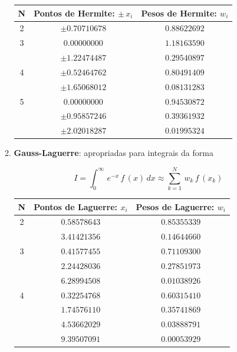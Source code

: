 \begin{enumerate}
\begin{enumerate}
{
\footnotesize
	\begin{center}
		\begin{tabular}{|c|c|c|}
		\hline		
		\textbf{N} & \textbf{Pontos de Hermite: $\pm \, x_i$} & \textbf{Pesos de Hermite: $w_i$} \\
		\hline \hline
		2 & $\pm 0.70710678$ & $0.88622692$ \\
		\hline
		3 & $0.00000000$     & $1.18163590$ \\
		  & $\pm 1.22474487$ & $0.29540897$ \\
		\hline
		4 & $\pm 0.52464762$ & $0.80491409$ \\
		  & $\pm 1.65068012$ & $0.08131283$ \\
		\hline
		5 & $    0.00000000$ & $0.94530872$ \\
		  & $\pm 0.95857246$ & $0.39361932$ \\
		  & $\pm 2.02018287$ & $0.01995324$ \\
		\hline
		\end{tabular}
	\end{center}
	\label{cap2:sec6:tab2}
}

\item
\textbf{Gauss-Laguerre}: apropriadas para integrais da forma

\[
 I = \int_0^\infty \, e^{-x} \, f\,(x) \, dx \approx \sum_{k=1}^N \, w_k \, f\,(x_k)
\]

{
\footnotesize
	\begin{center}
		\begin{tabular}{|c|c|c|}
		\hline		
		\textbf{N} & \textbf{Pontos de Laguerre: $x_i$} & \textbf{Pesos de Laguerre: $w_i$} \\
		\hline \hline
		2 & $0.58578643$ & $0.85355339$ \\
		  & $3.41421356$ & $0.14644660$ \\
		\hline
		3 & $0.41577455$ & $0.71109300$ \\
		  & $2.24428036$ & $0.27851973$ \\
		  & $6.28994508$ & $0.01038926$ \\
		\hline
		4 & $0.32254768$ & $0.60315410$ \\
		  & $1.74576110$ & $0.35741869$ \\
		  & $4.53662029$ & $0.03888791$ \\
		  & $9.39507091$ & $0.00053929$ \\
		\hline
		\end{tabular}
	\end{center}
	\label{cap2:sec6:tab3}
}


\end{enumerate}
\end{enumerate}
